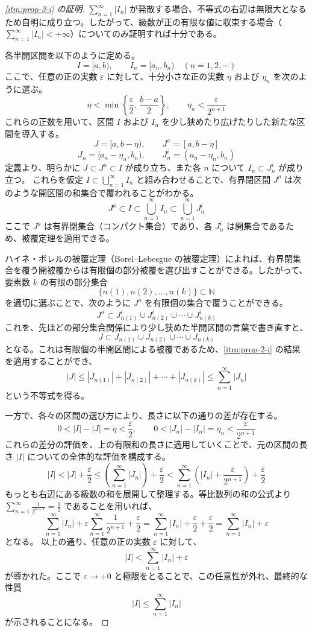 \documentclass[article,paper=a4paper]{jlreq}
\begin{document}
\begin{proof}[\ref{itm:prop-3-i} の証明]
$\sum_{n=1}^{\infty}|I_n|$ が発散する場合、不等式の右辺は無限大となるため自明に成り立つ。したがって、級数が正の有限な値に収束する場合（$\sum_{n=1}^{\infty}|I_n|<+\infty$）についてのみ証明すれば十分である。

各半開区間を以下のように定める。
\[
 I=[a,b),\qquad
 I_n=[a_n,b_n)\quad (n=1,2,\cdots)
\]
ここで、任意の正の実数 $\varepsilon$ に対して、十分小さな正の実数 $\eta$ および $\eta_n$ を次のように選ぶ。
\[
 \eta < \min\left\{ \frac{\varepsilon}{2},\, \frac{b-a}{2} \right\}, \qquad
 \eta_n < \frac{\varepsilon}{2^{n+1}}
\]
これらの正数を用いて、区間 $I$ および $I_n$ を少し狭めたり広げたりした新たな区間を導入する。
\[
 J=[a,b-\eta), \qquad J^{a}=[a,b-\eta]
\]
\[
 J_n=[a_n-\eta_n,b_n), \qquad J_n^{i}=(a_n-\eta_n,b_n)
\]
定義より、明らかに $J \subset J^{a} \subset I$ が成り立ち、また各 $n$ について $I_n \subset J_n^{i}$ が成り立つ。
これらを仮定 $I \subset \bigcup_{n=1}^{\infty}I_n$ と組み合わせることで、有界閉区間 $J^{a}$ は次のような開区間の和集合で覆われることがわかる。
\[
 J^{a} \subset I \subset \bigcup_{n=1}^{\infty}I_n \subset \bigcup_{n=1}^{\infty}J_n^{i}
\]
ここで $J^{a}$ は有界閉集合（コンパクト集合）であり、各 $J_n^{i}$ は開集合であるため、被覆定理を適用できる。

ハイネ・ボレルの被覆定理（Borel--Lebesgue の被覆定理）によれば、有界閉集合を覆う開被覆からは有限個の部分被覆を選び出すことができる。したがって、要素数 $k$ の有限の部分集合
\[
 \{n(1), n(2), \ldots, n(k)\} \subset \mathbb{N}
\]
を適切に選ぶことで、次のように $J^{a}$ を有限個の集合で覆うことができる。
\[
 J^{a} \subset J_{n(1)}^{i} \cup J_{n(2)}^{i} \cup \cdots \cup J_{n(k)}^{i}
\]
これを、先ほどの部分集合関係により少し狭めた半開区間の言葉で書き直すと、
\[
 J \subset J_{n(1)} \cup J_{n(2)} \cup \cdots \cup J_{n(k)}
\]
となる。これは有限個の半開区間による被覆であるため、\ref{itm:prop-2-i} の結果を適用することができ、
\[
 |J| \leq |J_{n(1)}| + |J_{n(2)}| + \cdots + |J_{n(k)}| \leq \sum_{n=1}^{\infty}|J_n|
\]
という不等式を得る。

一方で、各々の区間の選び方により、長さに以下の通りの差が存在する。
\[
 0 < |I|-|J| = \eta < \frac{\varepsilon}{2}, \qquad
 0 < |J_n|-|I_n| = \eta_n < \frac{\varepsilon}{2^{n+1}}
\]
これらの差分の評価を、上の有限和の長さに適用していくことで、元の区間の長さ $|I|$ についての全体的な評価を構成する。
\[
 |I| < |J| + \frac{\varepsilon}{2} \leq \left( \sum_{n=1}^{\infty}|J_n| \right) + \frac{\varepsilon}{2}
 < \sum_{n=1}^{\infty}\left( |I_n| + \frac{\varepsilon}{2^{n+1}} \right) + \frac{\varepsilon}{2}
\]
もっとも右辺にある級数の和を展開して整理する。等比数列の和の公式より $\sum_{n=1}^{\infty} \frac{1}{2^{n+1}} = \frac{1}{2}$ であることを用いれば、
\[
 \sum_{n=1}^{\infty}|I_n| + \varepsilon \sum_{n=1}^{\infty}\frac{1}{2^{n+1}} + \frac{\varepsilon}{2}
 = \sum_{n=1}^{\infty}|I_n| + \frac{\varepsilon}{2} + \frac{\varepsilon}{2}
 = \sum_{n=1}^{\infty}|I_n| + \varepsilon
\]
となる。
以上の通り、任意の正の実数 $\varepsilon$ に対して、
\[
 |I| < \sum_{n=1}^{\infty}|I_n| + \varepsilon
\]
が導かれた。ここで $\varepsilon \to +0$ と極限をとることで、この任意性が外れ、最終的な性質
\[
 |I| \leq \sum_{n=1}^{\infty}|I_n|
\]
が示されることになる。
\end{proof}
\end{document}
